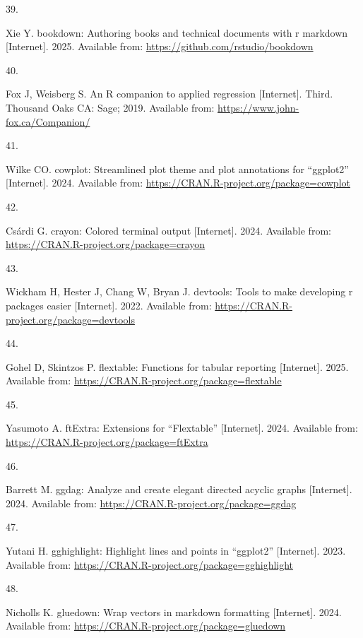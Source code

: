 \documentclass[
]{article}
\newlength{\cslhangindent}
\newlength{\csllabelwidth}
\newenvironment{CSLReferences}[2] %
 {\begin{list}{}{%
  \setlength{\itemindent}{0pt}
  \setlength{\leftmargin}{0pt}
  \setlength{\parsep}{0pt}
  \ifodd #1
   \setlength{\leftmargin}{\cslhangindent}
   \setlength{\itemindent}{-1\cslhangindent}
  \fi
  \setlength{\itemsep}{#2\baselineskip}}}
 {\end{list}}
\newcommand{\CSLLeftMargin}[1]{\parbox[t]{\csllabelwidth}{\strut#1\strut}}
\newcommand{\CSLRightInline}[1]{\parbox[t]{\linewidth - \csllabelwidth}{\strut#1\strut}}
\begin{document}
\begin{CSLReferences}{0}{1}
\CSLLeftMargin{39. }%
\CSLRightInline{Xie Y. {bookdown}: Authoring books and technical documents with r markdown {[}Internet{]}. 2025. Available from: \url{https://github.com/rstudio/bookdown}}

\CSLLeftMargin{40. }%
\CSLRightInline{Fox J, Weisberg S. An {R} companion to applied regression {[}Internet{]}. Third. Thousand Oaks {CA}: Sage; 2019. Available from: \url{https://www.john-fox.ca/Companion/}}

\CSLLeftMargin{41. }%
\CSLRightInline{Wilke CO. {cowplot}: Streamlined plot theme and plot annotations for {``{ggplot2}''} {[}Internet{]}. 2024. Available from: \url{https://CRAN.R-project.org/package=cowplot}}

\CSLLeftMargin{42. }%
\CSLRightInline{Csárdi G. {crayon}: Colored terminal output {[}Internet{]}. 2024. Available from: \url{https://CRAN.R-project.org/package=crayon}}

\CSLLeftMargin{43. }%
\CSLRightInline{Wickham H, Hester J, Chang W, Bryan J. {devtools}: Tools to make developing r packages easier {[}Internet{]}. 2022. Available from: \url{https://CRAN.R-project.org/package=devtools}}

\CSLLeftMargin{44. }%
\CSLRightInline{Gohel D, Skintzos P. {flextable}: Functions for tabular reporting {[}Internet{]}. 2025. Available from: \url{https://CRAN.R-project.org/package=flextable}}

\CSLLeftMargin{45. }%
\CSLRightInline{Yasumoto A. {ftExtra}: Extensions for {``{Flextable}''} {[}Internet{]}. 2024. Available from: \url{https://CRAN.R-project.org/package=ftExtra}}

\CSLLeftMargin{46. }%
\CSLRightInline{Barrett M. {ggdag}: Analyze and create elegant directed acyclic graphs {[}Internet{]}. 2024. Available from: \url{https://CRAN.R-project.org/package=ggdag}}

\CSLLeftMargin{47. }%
\CSLRightInline{Yutani H. {gghighlight}: Highlight lines and points in {``{ggplot2}''} {[}Internet{]}. 2023. Available from: \url{https://CRAN.R-project.org/package=gghighlight}}

\CSLLeftMargin{48. }%
\CSLRightInline{Nicholls K. {gluedown}: Wrap vectors in markdown formatting {[}Internet{]}. 2024. Available from: \url{https://CRAN.R-project.org/package=gluedown}}


\end{CSLReferences}
\end{document}

